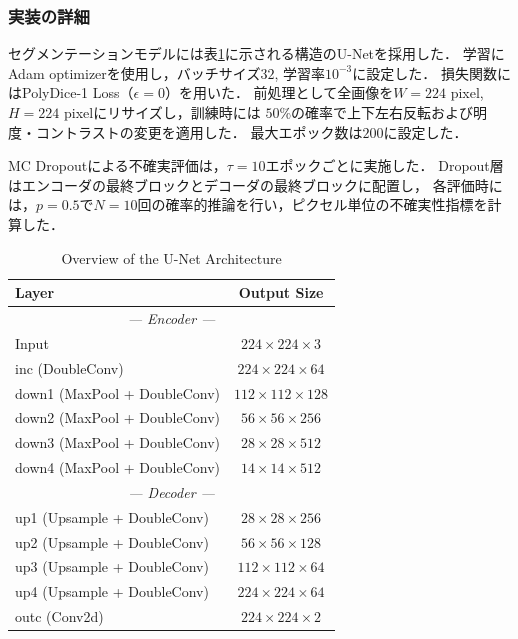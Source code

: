 \documentclass[10pt, a4paper, twocolumn]{jarticle}
\begin{document}
\subsubsection{実装の詳細}
セグメンテーションモデルには表\ref{tab:unet_architecture}に示される構造のU-Net\cite{ronneberger2015u}を採用した．
学習にAdam optimizer\cite{kingma2014adam}を使用し，バッチサイズ$32$, 学習率$10 ^ {-3}$に設定した．
損失関数にはPolyDice-1 Loss（$\epsilon = 0$）を用いた．
前処理として全画像を$W = 224$ pixel, $H = 224$ pixelにリサイズし，訓練時には
$50\%$の確率で上下左右反転および明度・コントラストの変更を適用した．
最大エポック数は$200$に設定した．

MC Dropoutによる不確実評価は，$\tau=10$エポックごとに実施した．
Dropout層はエンコーダの最終ブロックとデコーダの最終ブロックに配置し，
各評価時には，$p = 0.5$で$N = 10$回の確率的推論を行い，ピクセル単位の不確実性指標を計算した．

\begin{table}[htb]
  \centering
  \caption{Overview of the U-Net Architecture}
  \label{tab:unet_architecture}
  \begin{tabular}{lc}
    \toprule
    \textbf{Layer} & \textbf{Output Size} \\
    \midrule
    \multicolumn{2}{c}{\textit{--- Encoder ---}} \\
    Input & $224 \times 224 \times 3$ \\
    inc (DoubleConv) & $224 \times 224 \times 64$\\
    down1 (MaxPool + DoubleConv) & $112 \times 112 \times 128$ \\
    down2 (MaxPool + DoubleConv) & $56 \times 56 \times 256$ \\
    down3 (MaxPool + DoubleConv) & $28 \times 28 \times 512$ \\
    down4 (MaxPool + DoubleConv) & $14 \times 14 \times 512$ \\
    \midrule
    \multicolumn{2}{c}{\textit{--- Decoder ---}} \\
    up1 (Upsample + DoubleConv) & $28 \times 28 \times 256$ \\
    up2 (Upsample + DoubleConv) & $56 \times 56 \times 128$ \\
    up3 (Upsample + DoubleConv) & $112 \times 112 \times 64$ \\
    up4 (Upsample + DoubleConv) & $224 \times 224 \times 64$ \\
    \midrule
    outc (Conv2d) & $224 \times 224 \times 2$ \\
    \bottomrule
  \end{tabular}
\end{table}
\end{document}

